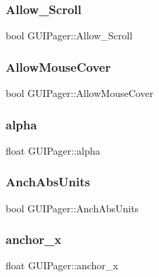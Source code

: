 \subsubsection{\texorpdfstring{Allow\+\_\+\+Scroll}{Allow\_Scroll}}
{\footnotesize\ttfamily bool G\+U\+I\+Pager\+::\+Allow\+\_\+\+Scroll}

\hypertarget{class_g_u_i_pager_abc5e49f96e071d561f24aee46e8f33dc}{}\label{class_g_u_i_pager_abc5e49f96e071d561f24aee46e8f33dc} 
\subsubsection{\texorpdfstring{Allow\+Mouse\+Cover}{AllowMouseCover}}
{\footnotesize\ttfamily bool G\+U\+I\+Pager\+::\+Allow\+Mouse\+Cover}

\hypertarget{class_g_u_i_pager_ac81978bdf247b4046fa037bd174324cf}{}\label{class_g_u_i_pager_ac81978bdf247b4046fa037bd174324cf} 
\subsubsection{\texorpdfstring{alpha}{alpha}}
{\footnotesize\ttfamily float G\+U\+I\+Pager\+::alpha}

\hypertarget{class_g_u_i_pager_a9b6eb87a2fd08e3b3df3628e5020c811}{}\label{class_g_u_i_pager_a9b6eb87a2fd08e3b3df3628e5020c811} 
\subsubsection{\texorpdfstring{Anch\+Abs\+Units}{AnchAbsUnits}}
{\footnotesize\ttfamily bool G\+U\+I\+Pager\+::\+Anch\+Abs\+Units}

\hypertarget{class_g_u_i_pager_afa8ada2adde9979d99d4f2d5b0d0a585}{}\label{class_g_u_i_pager_afa8ada2adde9979d99d4f2d5b0d0a585} 
\subsubsection{\texorpdfstring{anchor\+\_\+x}{anchor\_x}}
{\footnotesize\ttfamily float G\+U\+I\+Pager\+::anchor\+\_\+x}

